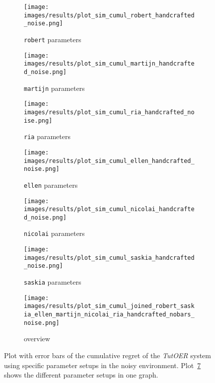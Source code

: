 
\begin{figure}[ht]
	\begin{subfigure}{0.48\linewidth}
	\texttt{[image: images/results/plot\_sim\_cumul\_robert\_handcrafted\_noise.png]}
	\caption{\texttt{robert} parameters}
	\label{fig:cumul_handcrafted_noise_robert}
	\end{subfigure}
	\hfill
	\begin{subfigure}{0.48\linewidth}
	\texttt{[image: images/results/plot\_sim\_cumul\_martijn\_handcrafted\_noise.png]}
	\caption{\texttt{martijn} parameters}
	\label{fig:cumul_handcrafted_noise_martijn}
	\end{subfigure}
	\begin{subfigure}{0.48\linewidth}
	\texttt{[image: images/results/plot\_sim\_cumul\_ria\_handcrafted\_noise.png]}
	\caption{\texttt{ria} parameters}
	\label{fig:cumul_handcrafted_noise_ria}
	\end{subfigure}
	\hfill
	\begin{subfigure}{0.48\linewidth}
	\texttt{[image: images/results/plot\_sim\_cumul\_ellen\_handcrafted\_noise.png]}
	\caption{\texttt{ellen} parameters}
	\label{fig:cumul_handcrafted_noise_ellen}
	\end{subfigure}
	\begin{subfigure}{0.48\linewidth}
	\texttt{[image: images/results/plot\_sim\_cumul\_nicolai\_handcrafted\_noise.png]}
	\caption{\texttt{nicolai} parameters}
	\label{fig:cumul_handcrafted_noise_nicolai}
	\end{subfigure}
	\hfill
	\begin{subfigure}{0.48\linewidth}
	\texttt{[image: images/results/plot\_sim\_cumul\_saskia\_handcrafted\_noise.png]}
	\caption{\texttt{saskia} parameters}
	\label{fig:cumul_handcrafted_noise_saskia}
	\end{subfigure}
	\begin{subfigure}{\linewidth}
	\texttt{[image: images/results/plot\_sim\_cumul\_joined\_robert\_saskia\_ellen\_martijn\_nicolai\_ria\_handcrafted\_nobars\_noise.png]}
	\caption{overview}
	\label{fig:cumul_handcrafted_noise_overview_group2}
	\end{subfigure}
	\caption{Plot with error bars of the cumulative regret of the \emph{TutOER}
	system using specific parameter setups in the noisy environment.
	Plot~\ref{fig:cumul_handcrafted_noise_overview_group2} shows the
	different parameter setups in one graph.}
	\label{fig:cumul_handcrafted_noise_container_group2}
\end{figure}

